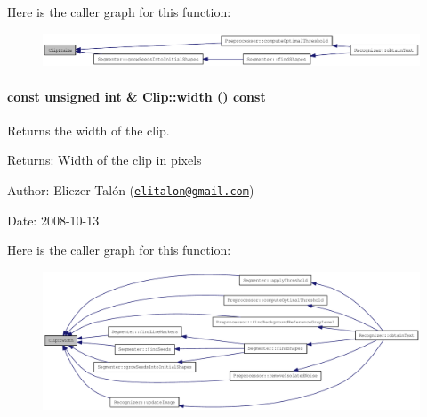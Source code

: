 Here is the caller graph for this function:\nopagebreak
\begin{figure}[H]
\begin{center}
\leavevmode
\includegraphics[width=397pt]{class_clip_eb6b12a1a0570b529d6a09633b991fcd_icgraph}
\end{center}
\end{figure}
\hypertarget{class_clip_88d1a47c0ec077e8c6680785509389b0}{
\paragraph[{width}]{\setlength{\rightskip}{0pt plus 5cm}const unsigned int \& Clip::width () const}\hfill}
\label{class_clip_88d1a47c0ec077e8c6680785509389b0}


Returns the width of the clip. 

\begin{Desc}
\item[Returns:]Width of the clip in pixels\end{Desc}
\begin{Desc}
\item[Author:]Eliezer Talón (\href{mailto:elitalon@gmail.com}{\tt elitalon@gmail.com}) \end{Desc}
\begin{Desc}
\item[Date:]2008-10-13 \end{Desc}


Here is the caller graph for this function:\nopagebreak
\begin{figure}[H]
\begin{center}
\leavevmode
\includegraphics[width=420pt]{class_clip_88d1a47c0ec077e8c6680785509389b0_icgraph}
\end{center}
\end{figure}
